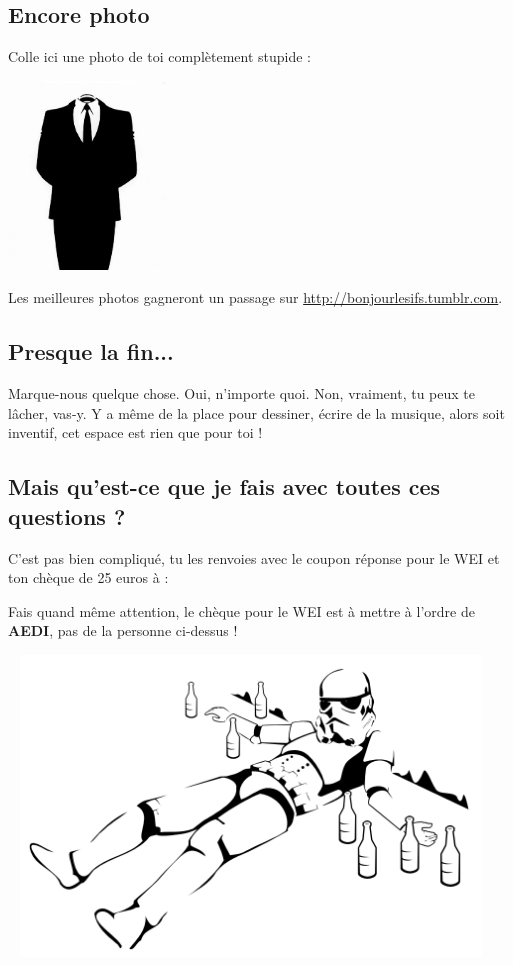\subsection*{Encore photo}
Colle ici une photo de toi complètement stupide :
\begin{center}
\includegraphics[height=5cm, angle=120]{images/anonymous.jpg}
\end{center}

Les meilleures photos gagneront un passage sur
\url{http://bonjourlesifs.tumblr.com}.

\subsection*{Presque la fin...}
Marque-nous quelque chose. Oui, n'importe quoi. Non, vraiment, tu peux te
lâcher, vas-y. Y a même de la place pour dessiner, écrire de la musique, alors soit inventif, cet
espace est rien que pour toi !
\vspace{8cm}
\subsection{Mais qu'est-ce que je fais avec toutes ces questions ?}
C'est pas bien compliqué, tu les renvoies avec le coupon réponse pour le WEI et
ton chèque de 25 euros à :
\adresseCoupon



Fais quand même attention, le chèque pour le WEI est à mettre à l'ordre de \textbf{AEDI}, pas de la personne ci-dessus !

\vfill
\columnbreak
~
\vfill
\hspace{-5cm}
\includegraphics[height=8cm]{images/stormTrooperBourre.png}
